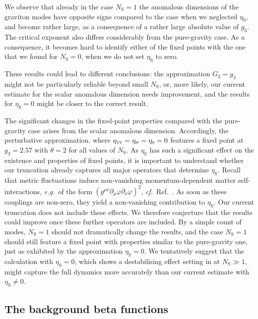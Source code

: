 \documentclass[11pt]{book}
\newcommand\TTspace{ -1pt }
\newcommand\etaTT{ \eta_{\scriptscriptstyle{\mathrm{T\hspace{\TTspace}T}}} }
\newcommand\etaS{ \eta_{\scriptscriptstyle{\mathrm{S}}} }
\newcommand\NS{ N_{\scriptscriptstyle{\mathrm{S}}} }
\newcommand\eg{\textit{e.g.}\ }
\newcommand\cf{\textit{cf.}\ }
\numberwithin{equation}{chapter}
\begin{document}
We observe that already in the case $\NS=1$
the anomalous dimensions of the graviton modes
have opposite signs compared to the case when we neglected $\etaS$,
and become rather large, as a consequence of a rather large absolute value of $g_3$.
The critical exponent also differs considerably from the pure-gravity case.
As a consequence, it becomes hard to identify either of the fixed points
with the one that we found for $\NS=0$, when we do not set $\etaS$ to zero.

These results could lead to different conclusions:
the approximation $G_3 = g_3$ might not be particularly reliable
beyond small $\NS$, or, more likely, our current estimate
for the scalar anomalous dimension needs improvement,
and the results for $\etaS=0$ might be closer to the correct result.

The significant changes in the fixed-point properties compared with the pure-gravity
case arises from the scalar anomalous dimension.
Accordingly, the perturbative approximation, where $\etaTT=\eta_{\sigma}=\etaS=0$
features a fixed point at $g_3=2.57$ with $\theta=2$ for all values of $\NS$.
As $\etaS$ has such a significant effect on the existence and properties of fixed points,
it is important to understand whether our truncation already captures all major operators
that determine $\etaS$.
Recall that metric fluctuations induce non-vanishing momentum-dependent
matter self-interactions, \eg of the form
$\left(g^{\mu \nu} \partial_{\mu} \varphi \partial_{\nu}\varphi\right)^2$,
\cf Ref.~\cite{Eichhorn:2012va}. As soon as these couplings
are non-zero, they yield a non-vanishing contribution to $\etaS$.
Our current truncation does not include these effects.
We therefore conjecture that the results could improve once these further operators are included.
By a simple count of modes, $\NS=1$ should not dramatically change the results, and the case $\NS=1$
should still feature a fixed point with properties similar to the pure-gravity one,
just as exhibited by the approximation $\etaS=0$.
We tentatively suggest that the calculation with $\etaS=0$,
which shows a destabilising effect setting in at $\NS\gg1$,
might capture the full dynamics more accurately than our current estimate with $\etaS \neq 0$.


\subsection{The background beta functions}
\end{document}
